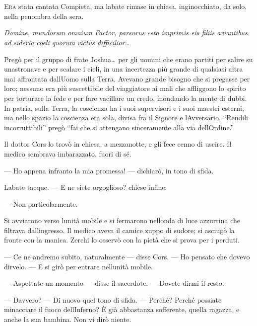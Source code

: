 	\chapter{\phantom{text}}

\lettrine{E}{ra} stata cantata Compieta, ma l\textquotesingle abate rimase in chiesa,
inginocchiato, da solo, nella penombra della sera.

\emph{Domine, mundorum omnium Factor, parsurus esto imprimis eis filiis
	aviantibus ad sideria coeli quorum victus difficilior\ldots{}}

Pregò per il gruppo di frate Joshua\ldots{} per gli uomini che erano
partiti per salire su un\textquotesingle astronave e per scalare i
cieli, in una incertezza più grande di qualsiasi altra mai affrontata
dall\textquotesingle Uomo sulla Terra. Avevano grande bisogno che si
pregasse per loro; nessuno era più suscettibile del viaggiatore ai mali
che affliggono lo spirito per torturare la fede e per fare vacillare un
credo, inondando la mente di dubbi. In patria, sulla Terra, la coscienza
ha i suoi supervisori e i suoi maestri esterni, ma nello spazio la
coscienza era sola, divisa fra il Signore e
l\textquotesingle Avversario. ``Rendili incorruttibili'' pregò ``fai che
si attengano sinceramente alla via dell\textquotesingle Ordine.''

Il dottor Cors lo trovò in chiesa, a mezzanotte, e gli fece cenno di
uscire. Il medico sembrava imbarazzato, fuori di sé.

--- Ho appena infranto la mia promessa! --- dichiarò, in tono di sfida.

L\textquotesingle abate tacque. --- E ne siete orgoglioso? chiese
infine.

--- Non particolarmente.

Si avviarono verso l\textquotesingle unità mobile e si fermarono
nell\textquotesingle onda di luce azzurrina che filtrava
dall\textquotesingle ingresso. Il medico aveva il camice zuppo di
sudore; si asciugò la fronte con la manica. Zerchi lo osservò con la
pietà che si prova per i perduti.

--- Ce ne andremo subito, naturalmente --- disse Cors. --- Ho pensato
che dovevo dirvelo. --- E si girò per entrare nell\textquotesingle unità
mobile.

--- Aspettate un momento --- disse il sacerdote. --- Dovete dirmi il
resto.

--- Davvero? --- Di nuovo quel tono di sfida. --- Perché? Perché
possiate minacciare il fuoco dell\textquotesingle Inferno? È già
abbastanza sofferente, quella ragazza, e anche la sua bambina. Non vi
dirò niente.

